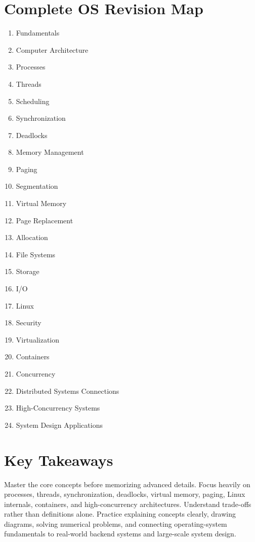 \section{Complete OS Revision Map}

\begin{enumerate}
\item Fundamentals
\item Computer Architecture
\item Processes
\item Threads
\item Scheduling
\item Synchronization
\item Deadlocks
\item Memory Management
\item Paging
\item Segmentation
\item Virtual Memory
\item Page Replacement
\item Allocation
\item File Systems
\item Storage
\item I/O
\item Linux
\item Security
\item Virtualization
\item Containers
\item Concurrency
\item Distributed Systems Connections
\item High-Concurrency Systems
\item System Design Applications
\end{enumerate}

\section{Key Takeaways}

\begin{keytakeaways}
Master the core concepts before memorizing advanced details. Focus heavily on processes, threads, synchronization, deadlocks, virtual memory, paging, Linux internals, containers, and high-concurrency architectures. Understand trade-offs rather than definitions alone. Practice explaining concepts clearly, drawing diagrams, solving numerical problems, and connecting operating-system fundamentals to real-world backend systems and large-scale system design.
\end{keytakeaways}
